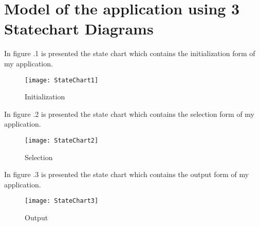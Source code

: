 
\setlength{\parindent}{2ex}
\section{Model of the application using 3 Statechart Diagrams}
In figure \thesection.1 is presented the state chart which contains the initialization form of my application.
\begin{figure}[h!]
	\centering
	\texttt{[image: StateChart1]}
	\caption{Initialization} 
\end{figure}
\par
In figure \thesection.2 is presented the state chart which contains the selection form of my application.
\begin{figure}[h!]
	\centering
	\texttt{[image: StateChart2]}
	\caption{Selection} 
\end{figure}
\newpage
In figure \thesection.3 is presented the state chart which contains the output form of my application.
\begin{figure}[h!]
	\centering
	\texttt{[image: StateChart3]}
	\caption{Output} 
\end{figure}
\par
\newpage
